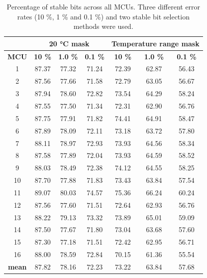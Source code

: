 \begin{table}[ht!]
    \centering
    \begin{tabular}{c||ccc|ccc}
        \multicolumn{1}{c}{} & \multicolumn{3}{c}{\textbf{20 °C mask}} & \multicolumn{3}{c}{\textbf{Temperature range mask}} \\
    \toprule
    \textbf{MCU} &  \textbf{10 \%} &  \textbf{1.0 \%} &  \textbf{0.1 \%} &  \textbf{10 \%} &  \textbf{1.0 \%} &  \textbf{0.1 \%} \\
    \midrule
    1    &   87.37 &  77.32 &  71.24 &    72.39 &   62.87 &   56.43 \\
    2    &   87.56 &  77.66 &  71.58 &    72.79 &   63.05 &   56.67 \\
    3    &   87.94 &  78.60 &  72.82 &    73.54 &   64.29 &   58.24 \\
    4    &   87.55 &  77.50 &  71.34 &    72.31 &   62.90 &   56.76 \\
    5    &   87.75 &  77.91 &  71.82 &    74.41 &   64.91 &   58.47 \\
    6    &   87.89 &  78.09 &  72.11 &    73.18 &   63.72 &   57.80 \\
    7    &   88.11 &  78.97 &  72.93 &    73.93 &   64.56 &   58.34 \\
    8    &   87.58 &  77.89 &  72.04 &    73.93 &   64.59 &   58.52 \\
    9    &   88.03 &  78.49 &  72.38 &    74.12 &   64.55 &   58.25 \\
    10   &   87.70 &  77.88 &  71.83 &    73.43 &   63.84 &   57.54 \\
    11   &   89.07 &  80.03 &  74.57 &    75.36 &   66.24 &   60.24 \\
    12   &   87.56 &  77.60 &  71.51 &    72.64 &   62.93 &   56.76 \\
    13   &   88.22 &  79.13 &  73.32 &    73.89 &   65.01 &   59.09 \\
    14   &   87.50 &  77.67 &  71.80 &    73.04 &   63.68 &   57.60 \\
    15   &   87.30 &  77.18 &  71.51 &    72.42 &   62.95 &   56.71 \\
    16   &   88.00 &  78.59 &  72.84 &    70.15 &   61.36 &   55.54 \\
    \textbf{mean} &   87.82 &  78.16 &  72.23 &    73.22 &   63.84 &   57.68 \\
    \bottomrule
    \end{tabular}
    \captionsetup{justification=centering,margin=0.5cm}
    \caption{Percentage of stable bits across all MCUs. Three different error rates (10 \%, 1 \% and 0.1 \%) and two stable bit selection methods were used.}
    \label{table:stable_bits}
    \vspace{-1.5em}
\end{table}

